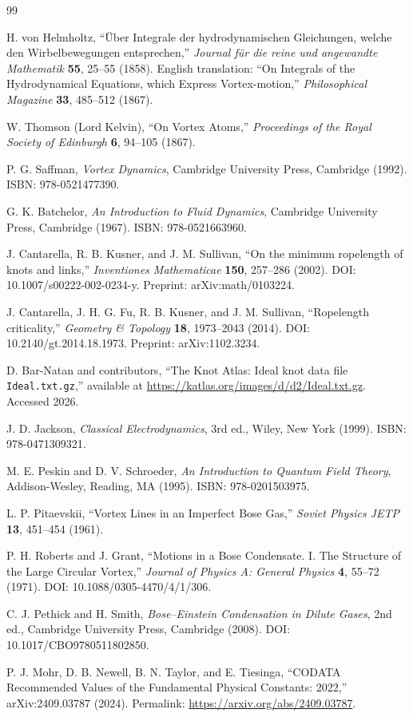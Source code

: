 \documentclass[11pt]{article}
\begin{document}
\begin{thebibliography}{99}

H. von Helmholtz, ``Über Integrale der hydrodynamischen Gleichungen, welche den Wirbelbewegungen entsprechen,''
\emph{Journal für die reine und angewandte Mathematik} \textbf{55}, 25--55 (1858).
English translation: ``On Integrals of the Hydrodynamical Equations, which Express Vortex-motion,''
\emph{Philosophical Magazine} \textbf{33}, 485--512 (1867).

W. Thomson (Lord Kelvin), ``On Vortex Atoms,''
\emph{Proceedings of the Royal Society of Edinburgh} \textbf{6}, 94--105 (1867).

P. G. Saffman, \emph{Vortex Dynamics}, Cambridge University Press, Cambridge (1992).
ISBN: 978-0521477390.

G. K. Batchelor, \emph{An Introduction to Fluid Dynamics}, Cambridge University Press, Cambridge (1967).
ISBN: 978-0521663960.

J. Cantarella, R. B. Kusner, and J. M. Sullivan,
``On the minimum ropelength of knots and links,''
\emph{Inventiones Mathematicae} \textbf{150}, 257--286 (2002).
DOI: 10.1007/s00222-002-0234-y.
Preprint: arXiv:math/0103224.

J. Cantarella, J. H. G. Fu, R. B. Kusner, and J. M. Sullivan,
``Ropelength criticality,''
\emph{Geometry \& Topology} \textbf{18}, 1973--2043 (2014).
DOI: 10.2140/gt.2014.18.1973.
Preprint: arXiv:1102.3234.

D. Bar-Natan and contributors,
``The Knot Atlas: Ideal knot data file \texttt{Ideal.txt.gz},''
available at \url{https://katlas.org/images/d/d2/Ideal.txt.gz}.
Accessed 2026.

J. D. Jackson, \emph{Classical Electrodynamics}, 3rd ed.,
Wiley, New York (1999). ISBN: 978-0471309321.

M. E. Peskin and D. V. Schroeder,
\emph{An Introduction to Quantum Field Theory},
Addison-Wesley, Reading, MA (1995). ISBN: 978-0201503975.

L. P. Pitaevskii,
``Vortex Lines in an Imperfect Bose Gas,''
\emph{Soviet Physics JETP} \textbf{13}, 451--454 (1961).

P. H. Roberts and J. Grant,
``Motions in a Bose Condensate. I. The Structure of the Large Circular Vortex,''
\emph{Journal of Physics A: General Physics} \textbf{4}, 55--72 (1971).
DOI: 10.1088/0305-4470/4/1/306.

C. J. Pethick and H. Smith,
\emph{Bose--Einstein Condensation in Dilute Gases}, 2nd ed.,
Cambridge University Press, Cambridge (2008).
DOI: 10.1017/CBO9780511802850.

P. J. Mohr, D. B. Newell, B. N. Taylor, and E. Tiesinga,
``CODATA Recommended Values of the Fundamental Physical Constants: 2022,''
arXiv:2409.03787 (2024).
Permalink: \url{https://arxiv.org/abs/2409.03787}.

\end{thebibliography}
\end{document}
